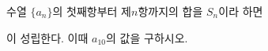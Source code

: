 \hspace*{2mm}\begin{minipage}[t]{\dimexpr\linewidth-2mm\relax}\vspace{0pt}
수열 $\{a_n\}$의 첫째항부터 제$n$항까지의 합을 $S_n$이라 하면 \par\smallskip{}\par\smallskip\noindent 이 성립한다. 이때 $a_{10}$의 값을 구하시오.\end{minipage}

